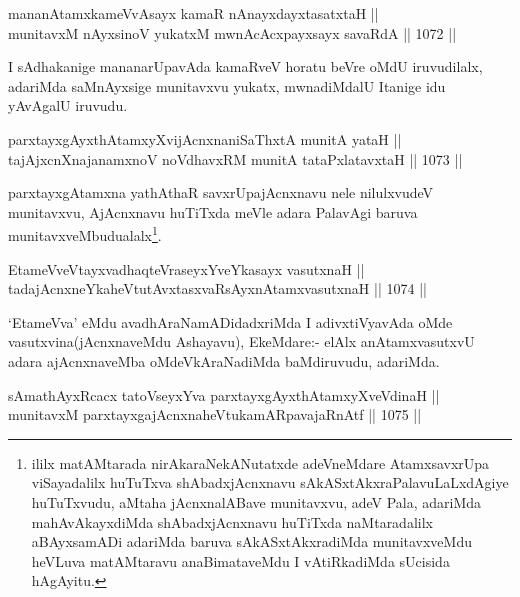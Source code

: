\begin{shl}
mananAtamxkameVvAsayx kamaR nAnayxdayxtasatxtaH || \\
munitavxM nAyxsinoV yukatxM mwnAcAcxpayxsayx savaRdA \hfill || 1072 ||  
\end{shl}

\begin{artha}
I sAdhakanige mananarUpavAda kamaRveV horatu beVre oMdU iruvudilalx, adariMda saMnAyxsige munitavxvu yukatx, mwnadiMdalU Itanige idu yAvAgalU iruvudu.
\end{artha}


\begin{shl}
parxtayxgAyxthAtamxyXvijAcnxnaniSaThxtA munitA yataH || \\
tajAjxcnXnajanamxnoV noVdhavxRM munitA tataPxlatavxtaH \hfill || 1073 ||  
\end{shl}

\begin{artha}
parxtayxgAtamxna yathAthaR savxrUpajAcnxnavu nele nilulxvudeV munitavxvu, AjAcnxnavu huTiTxda meVle adara PalavAgi baruva munitavxveMbudualalx\footnote{ililx matAMtarada nirAkaraNekANutatxde adeVneMdare AtamxsavxrUpa viSayadalilx huTuTxva shAbadxjAcnxnavu sAkASxtAkxraPalavuLaLxdAgiye huTuTxvudu, aMtaha jAcnxnalABave munitavxvu, adeV Pala, adariMda mahAvAkayxdiMda shAbadxjAcnxnavu huTiTxda naMtaradalilx aBAyxsamADi adariMda baruva sAkASxtAkxradiMda munitavxveMdu heVLuva matAMtaravu anaBimataveMdu I vAtiRkadiMda sUcisida hAgAyitu.}.
\end{artha}

\begin{shl}
EtameVveVtayxvadhaqteVraseyxYveYkasayx vasutxnaH || \\
tadajAcnxneYkaheVtutAvxtasxvaRsAyxnAtamxvasutxnaH \hfill || 1074 ||  
\end{shl}

\begin{artha}
`EtameVva' eMdu avadhAraNamADidadxriMda I adivxtiVyavAda oMde vasutxvina(jAcnxnaveMdu Ashayavu), EkeMdare:- elAlx anAtamxvasutxvU adara ajAcnxnaveMba oMdeVkAraNadiMda baMdiruvudu, adariMda.
\end{artha}

\begin{shl}
sAmathAyxRcacx tatoV\s seyxYva parxtayxgAyxthAtamxyXveVdinaH ||  \\
munitavxM parxtayxgajAcnxnaheVtukamARpavajaRnAtf \hfill || 1075 ||  
\end{shl}

